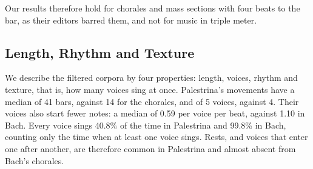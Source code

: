 Our results therefore hold for chorales and mass sections with four beats to the bar, as their editors barred them, and not for music in triple meter.

\subsection{Length, Rhythm and Texture}

We describe the filtered corpora by four properties: length, voices, rhythm and texture, that is, how many voices sing at once. Palestrina's movements have a median of 41 bars, against 14 for the chorales, and of 5 voices, against 4. Their voices also start fewer notes: a median of 0.59 per voice per beat, against 1.10 in Bach. Every voice sings 40.8\% of the time in Palestrina and 99.8\% in Bach, counting only the time when at least one voice sings. Rests, and voices that enter one after another, are therefore common in Palestrina and almost absent from Bach's chorales.







